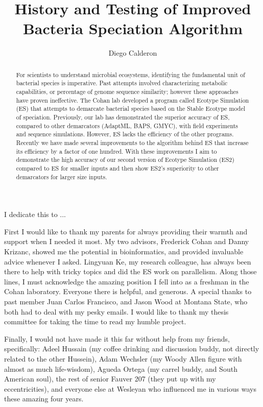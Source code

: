 \documentclass[11pt, final]{westhesis}
\title{History and Testing of Improved Bacteria Speciation Algorithm}
\author{Diego Calderon}
\begin{document}

\begin{dedication}
I dedicate this to ...
\end{dedication}

\begin{acknowledgements}
First I would like to thank my parents for always providing their warmth and support when I needed it most.
My two advisors, Frederick Cohan and Danny Krizanc, showed me the potential in bioinformatics, and provided invaluable advice whenever I asked.
Lingyuan Ke, my research colleague, has always been there to help with tricky topics and did the ES work on parallelism.
Along those lines, I must acknowledge the amazing position I fell into as a freshman in the Cohan laboratory.
Everyone there is helpful, and generous.
A special thanks to past member Juan Carlos Francisco, and Jason Wood at Montana State, who both had to deal with my pesky emails.
I would like to thank my thesis committee for taking the time to read my humble project.

Finally, I would not have made it this far without help from my friends, specifically: Adeel Hussain (my coffee drinking and discussion buddy, not directly related to the other Hussein), Adam Wechsler (my Woody Allen figure with almost as much life-wisdom), Agueda Ortega (my carrel buddy,  and South American soul), the rest of senior Fauver 207 (they put up with my eccentricities), and everyone else at Wesleyan who influenced me in various ways these amazing four years.
\end{acknowledgements}


\begin{abstract}
For scientists to understand microbial ecosystems, identifying the fundamental unit of bacterial species is imperative.
Past attempts involved characterizing metabolic capabilities, or percentage of genome sequence similarity; however these approaches have proven ineffective.
The Cohan lab developed a program called Ecotype Simulation (ES) that attempts to demarcate bacterial species based on the Stable Ecotype model of speciation.
Previously, our lab has demonstrated the superior accuracy of ES, compared to other demarcators (AdaptML, BAPS, GMYC), with field experiments and sequence simulations.
However, ES lacks the efficiency of the other programs.
Recently we have made several improvements to the algorithm behind ES that increase its efficiency by a factor of one hundred.
With these improvements I aim to demonstrate the high accuracy of our second version of Ecotype Simulation (ES2) compared to ES for smaller inputs and then show ES2's superiority to other demarcators for larger size inputs.
\end{abstract}
\end{document}
